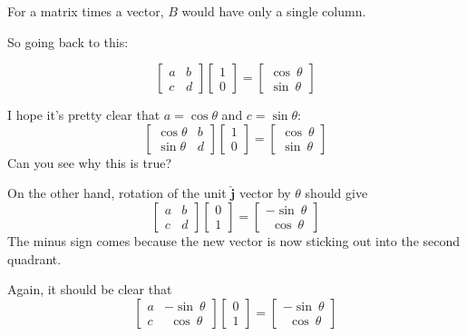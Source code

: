\documentclass[11pt, oneside]{article}   	%
\begin{document}
For a matrix times a vector, $B$ would have only a single column.

So going back to this:

\[
\begin{bmatrix}  
a & b  \\  
c & d  
\end{bmatrix}
\begin{bmatrix}  
1  \\  
0  
\end{bmatrix}
=
\begin{bmatrix}  
\cos\  \theta  \\  
\sin\  \theta  
\end{bmatrix}
\]


I hope it's pretty clear that $a = \cos \theta$ and $c = \sin \theta$:
\[
\begin{bmatrix}  
\cos \theta & b  \\  
\sin \theta & d  
\end{bmatrix}
\begin{bmatrix}  
1  \\  
0  
\end{bmatrix}
=
\begin{bmatrix}  
\cos\  \theta  \\  
\sin\  \theta  
\end{bmatrix}
\]
Can you see why this is true?

On the other hand, rotation of the unit $\hat{\mathbf{j}}$ vector by $\theta$ should give
\[
\begin{bmatrix}  
a & b  \\  
c & d  
\end{bmatrix}
\begin{bmatrix}  
0  \\  
1  
\end{bmatrix}
=
\begin{bmatrix}  
-\sin \  \theta  \\  
\ \ \cos \  \theta  
\end{bmatrix}
\]
The minus sign comes because the new vector is now sticking out into the second quadrant.

Again, it should be clear that 
\[
\begin{bmatrix}  
a & -\sin \  \theta  \\  
c & \ \ \cos \  \theta  
\end{bmatrix}
\begin{bmatrix}  
0  \\  
1  
\end{bmatrix}
=
\begin{bmatrix}  
-\sin \  \theta  \\  
\ \ \cos \  \theta  
\end{bmatrix}
\]
\end{document}
